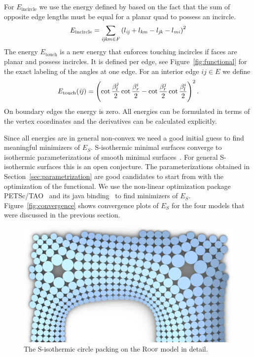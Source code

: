 For $E_{\mathrm{incircle}}$ we use the energy defined by
\cite{Schiftner2009} based on the fact that the sum of opposite edge
lengths must be equal for a planar quad to possess an incircle.
\begin{equation}
E_{\mathrm{incircle}} = \sum_{\mathrm{\it{ijkm}} \in F} \left( l_{\mathrm{\it{ij}}} + 
l_{\mathrm{\it{km}}} - l_{\mathrm{\it{jk}}} - l_{\mathrm{\it{mi}}} \right)^2
\end{equation}
The energy
$E_{\mathrm{touch}}$ is a new energy that enforces touching incircles
if faces are planar and possess incircles.  It is defined per edge, see
Figure~\ref{fig:functional} for the exact labeling of the angles at one edge.
For an interior edge $ij\in E$ we define
\begin{equation}
  E_{\mathrm{touch}}(\mathrm{\it{ij}})=
  \left(\cot\frac{\beta^j_l}{2}\cot\frac{\beta^i_r}{2} - 
\cot\frac{\beta^j_r}{2}\cot\frac{\beta^i_l}{2}\right)^2.
\end{equation}
On boundary edges the energy is zero. All energies can be formulated 
in terms of the vertex coordinates and the derivatives can be calculated explicitly.



Since all energies are in general non-convex we need a good initial guess to 
find meaningful minimizers of $E_S$.
S-isothermic minimal surfaces converge to isothermic parameterizations of
smooth minimal surfaces~\cite{BobHofSpr06}. For general S-isothermic surfaces
this is an open conjecture. The parameterizations obtained in
Section~\ref{sec:parametrization} are good candidates to start from with the
optimization of the functional.
We use the non-linear optimization package PETSc/TAO~\cite{petsc-web-page,
tao-user-ref} and its java binding~\cite{jpetsctao-web-page} to find
minimizers of $E_S$. Figure~\ref{fig:convergence} shows convergence plots of
$E_S$ for the four models that were discussed in the previous section.
\begin{figure}
\centering
\includegraphics[width=\linewidth]{image/aag2012/dach_example01_circles.png}
\caption{The S-isothermic circle packing on the \textsc{Roof} model in detail.}
\end{figure}

